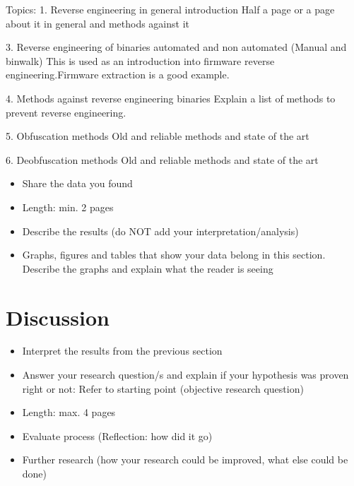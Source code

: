 \documentclass[]{report}
\begin{document}
Topics:
1. Reverse engineering in general introduction 
	Half a page or a page about it in general and methods against it
	
3. Reverse engineering of binaries automated and non automated (Manual and binwalk)
	This is used as an introduction into firmware reverse engineering.Firmware extraction is a good example.

4. Methods against reverse engineering binaries
	Explain a list of methods to prevent reverse engineering.
	
5. Obfuscation methods 
	Old and reliable methods and state of the art
	
6. Deobfuscation methods
	Old and reliable methods and state of the art


\begin{itemize}
	\item Share the data you found
	\item Length: min. 2 pages
	\item Describe the results (do NOT add your interpretation/analysis)
	\item Graphs, figures and tables that show your data belong in this section. Describe the graphs and explain what the reader is seeing

\end{itemize}

	
\section{Discussion}
\begin{itemize}
	\item Interpret the results from the previous section
	\item Answer your research question/s and explain if your hypothesis was proven right or not: Refer to starting point (objective research question)

	\item Length: max. 4 pages
	\item Evaluate process (Reflection: how did it go)
	\item Further research (how your research could be improved, what else could be done)
\end{itemize}
\end{document}
